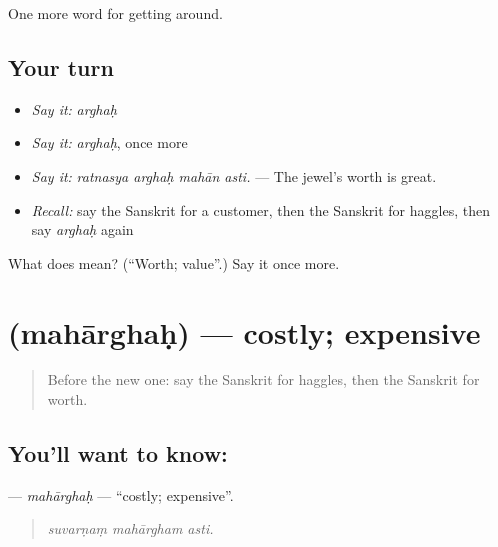 \begin{grammarlens}[title={What you've built}]
One more word for getting around.
\end{grammarlens}

\subsection*{Your turn}
\begin{itemize}
\raggedright
  \item \emph{Say it:} \emph{arghaḥ}
  \item \emph{Say it:} \emph{arghaḥ}, once more
  \item \emph{Say it:} \emph{ratnasya arghaḥ mahān asti.} — The jewel's worth is great.
  \item \emph{Recall:} say the Sanskrit for a customer, then the Sanskrit for haggles, then say \emph{arghaḥ} again
\end{itemize}

\begin{tcolorbox}[breakable,colback=teal!4,colframe=teal!35!black,title={Before you move on}]
What does  mean? (\textquotedblleft{}Worth; value\textquotedblright{}.) Say it once more.
\end{tcolorbox}
\section[\texorpdfstring{\sk{महार्घः} (mahārghaḥ)}{महार्घः (mahārghaḥ)}]{ (mahārghaḥ) — costly; expensive}

\label{lesson:SA-C431-maharghah}



\begin{quote}
Before the new one: say the Sanskrit for haggles, then the Sanskrit for worth.
\end{quote}

\subsection*{You'll want to know: }
\textbf{} — \emph{mahārghaḥ} — \textquotedblleft{}costly; expensive\textquotedblright{}.

\begin{quote}
  
\end{quote}

\begin{quote}
\emph{suvarṇaṃ mahārgham asti.}
\end{quote}

